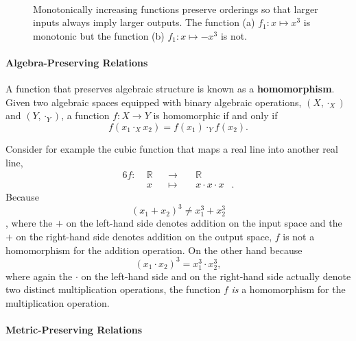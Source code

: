 \documentclass[
  letterpaper,
  DIV=11,
  numbers=noendperiod]{scrartcl}
\let\oldparagraph\paragraph
\renewcommand{\paragraph}[1]{\oldparagraph{#1}\mbox{}}
\begin{document}
\begin{figure}
\begin{minipage}[t]{0.45\linewidth}
{{}

}

\subcaption{\label{fig-non-monotonic}}
\end{minipage}%
%
\begin{minipage}[t]{0.05\linewidth}

{\centering 

~

}

\end{minipage}%

\caption{\label{fig-monoticity}Monotonically increasing functions
preserve orderings so that larger inputs always imply larger outputs.
The function (a) \(f_{1} : x \mapsto x^{3}\) is monotonic but the
function (b) \(f_{1} : x \mapsto -x^{3}\) is not.}

\end{figure}

\hypertarget{algebra-preserving-relations}{%
\paragraph{Algebra-Preserving
Relations}\label{algebra-preserving-relations}}

A function that preserves algebraic structure is known as a
\textbf{homomorphism}. Given two algebraic spaces equipped with binary
algebraic operations, \((X, \cdot_{X})\) and \((Y, \cdot_{Y})\), a
function \(f : X \rightarrow Y\) is homomorphic if and only if \[
f(x_{1} \cdot_{X} x_{2}) = f(x_{1}) \cdot_{Y} f(x_{2}).
\]

Consider for example the cubic function that maps a real line into
another real line, \begin{alignat*}{6}
f :\; & \mathbb{R} & &\rightarrow& \; & \mathbb{R} &
\\
& x & &\mapsto& & x \cdot x \cdot x &.
\end{alignat*} Because \[
(x_1 + x_2)^3 \ne x_1^3 + x_2^3
\], where the \(+\) on the left-hand side denotes addition on the input
space and the \(+\) on the right-hand side denotes addition on the
output space, \(f\) is not a homomorphism for the addition operation. On
the other hand because \[
(x_1 \cdot x_2)^3 = x_1^3 \cdot x_2^3,
\] where again the \(\cdot\) on the left-hand side and on the right-hand
side actually denote two distinct multiplication operations, the
function \(f\) \emph{is} a homomorphism for the multiplication
operation.

\hypertarget{metric-preserving-relations}{%
\paragraph{Metric-Preserving
Relations}\label{metric-preserving-relations}}
\end{document}
